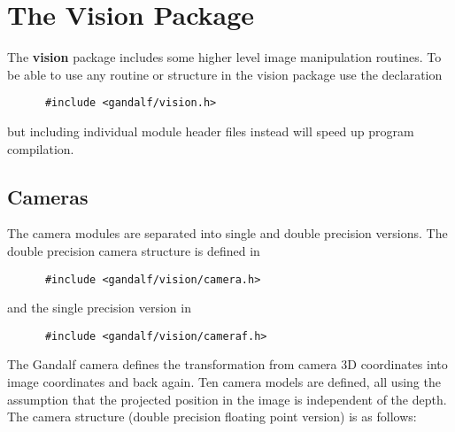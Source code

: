 \chapter{The Vision Package} \label{vision-chapter}
The {\bf vision} package includes some higher level image manipulation
routines.
To be able to use any routine or structure in the vision package
use the declaration
\begin{verbatim}
      #include <gandalf/vision.h>
\end{verbatim}
but including individual module header files instead will speed up program
compilation.

\section{Cameras} \label{camera-sec}
The camera modules are separated into single and double precision versions.
The double precision camera structure is defined in
\begin{verbatim}
      #include <gandalf/vision/camera.h>
\end{verbatim}
and the single precision version in
\begin{verbatim}
      #include <gandalf/vision/cameraf.h>
\end{verbatim}
The Gandalf camera defines the transformation from camera 3D coordinates
into image coordinates and back again. Ten camera models are defined,
all using the assumption that the projected position in the image is
independent of the depth.
The camera structure (double precision floating point version) is as follows:
